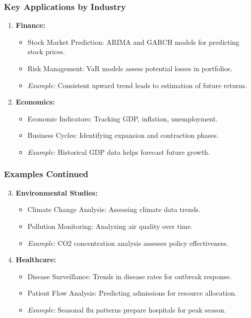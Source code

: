 \documentclass[aspectratio=169]{beamer}
\begin{document}
\begin{frame}[fragile]
    \frametitle{Key Applications by Industry}
    \begin{enumerate}
        \item \textbf{Finance:}
        \begin{itemize}
            \item Stock Market Prediction: ARIMA and GARCH models for predicting stock prices.
            \item Risk Management: VaR models assess potential losses in portfolios.
            \item \textit{Example:} Consistent upward trend leads to estimation of future returns.
        \end{itemize}
        
        \item \textbf{Economics:}
        \begin{itemize}
            \item Economic Indicators: Tracking GDP, inflation, unemployment.
            \item Business Cycles: Identifying expansion and contraction phases.
            \item \textit{Example:} Historical GDP data helps forecast future growth.
        \end{itemize}
    \end{enumerate}
\end{frame}

\begin{frame}[fragile]
    \frametitle{Examples Continued}
    \begin{enumerate}
        \setcounter{enumi}{2} %
        \item \textbf{Environmental Studies:}
        \begin{itemize}
            \item Climate Change Analysis: Assessing climate data trends.
            \item Pollution Monitoring: Analyzing air quality over time.
            \item \textit{Example:} CO2 concentration analysis assesses policy effectiveness.
        \end{itemize}
        
        \item \textbf{Healthcare:}
        \begin{itemize}
            \item Disease Surveillance: Trends in disease rates for outbreak response.
            \item Patient Flow Analysis: Predicting admissions for resource allocation.
            \item \textit{Example:} Seasonal flu patterns prepare hospitals for peak season.
        \end{itemize}
    \end{enumerate}
\end{frame}
\end{document}
